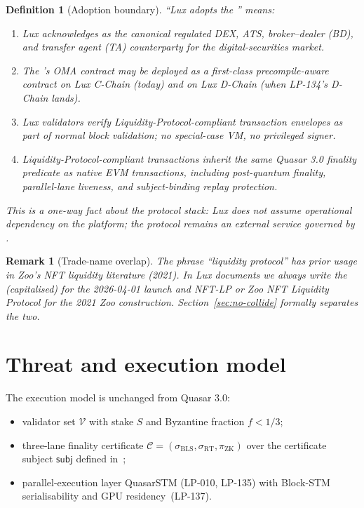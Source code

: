 \documentclass[11pt]{article}
\newtheorem{definition}{Definition}
\newtheorem{remark}{Remark}
\begin{document}
\begin{definition}[Adoption boundary]
\label{def:boundary}
``Lux adopts the '' means:
\begin{enumerate}[nosep]
  \item Lux acknowledges  as the canonical regulated DEX,
        ATS, broker--dealer (BD), and transfer agent (TA) counterparty
        for the digital-securities market.
  \item The 's OMA contract may be deployed as a
        first-class precompile-aware contract on Lux C-Chain (today)
        and on Lux D-Chain (when LP-134's D-Chain lands).
  \item Lux validators verify Liquidity-Protocol-compliant transaction
        envelopes as part of normal block validation; no special-case
        VM, no privileged signer.
  \item Liquidity-Protocol-compliant transactions inherit the same
        Quasar 3.0 finality predicate as native EVM transactions,
        including post-quantum finality, parallel-lane liveness, and
        subject-binding replay protection.
\end{enumerate}
This is a one-way fact about the protocol stack: Lux does not assume
operational dependency on the  platform; the protocol
remains an external service governed by .
\end{definition}

\begin{remark}[Trade-name overlap]
The phrase ``liquidity protocol'' has prior usage in Zoo's NFT
liquidity literature (2021).  In Lux documents we always write
\emph{the } (capitalised) for the 2026-04-01
 launch and \emph{NFT-LP} or \emph{Zoo NFT Liquidity
Protocol} for the 2021 Zoo construction.  Section~\ref{sec:no-collide}
formally separates the two.
\end{remark}

\section{Threat and execution model}
\label{sec:model}

The execution model is unchanged from Quasar 3.0:
\begin{itemize}[nosep]
  \item validator set $\mathcal{V}$ with stake $S$ and Byzantine
        fraction $f < 1/3$;
  \item three-lane finality certificate
        $\mathcal{C} = (\sigma_{\mathrm{BLS}}, \sigma_{\mathrm{RT}},
        \pi_{\mathrm{ZK}})$ over the certificate subject
        $\mathsf{subj}$ defined in~\cite{quasar-cert};
  \item parallel-execution layer QuasarSTM (LP-010, LP-135) with
        Block-STM serialisability and GPU residency~(LP-137).
\end{itemize}
\end{document}
